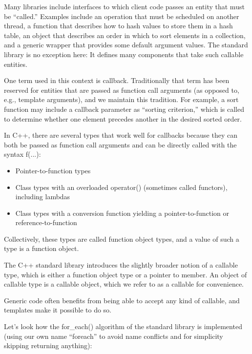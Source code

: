 
Many libraries include interfaces to which client code passes an entity that must be “called.” Examples include an operation that must be scheduled on another thread, a function that describes how to hash values to store them in a hash table, an object that describes an order in which to sort elements in a collection, and a generic wrapper that provides some default argument values. The standard library is no exception here: It defines many components that take such callable entities.

One term used in this context is callback. Traditionally that term has been reserved for entities that are passed as function call arguments (as opposed to, e.g., template arguments), and we maintain this tradition. For example, a sort function may include a callback parameter as “sorting criterion,” which is called to determine whether one element precedes another in the desired sorted order.

In C++, there are several types that work well for callbacks because they can both be passed as function call arguments and can be directly called with the syntax f(...):

\begin{itemize}
\item 
Pointer-to-function types

\item 
Class types with an overloaded operator() (sometimes called functors), including lambdas

\item 
Class types with a conversion function yielding a pointer-to-function or reference-to-function
\end{itemize}

Collectively, these types are called function object types, and a value of such a type is a function object.

The C++ standard library introduces the slightly broader notion of a callable type, which is either a function object type or a pointer to member. An object of callable type is a callable object, which we refer to as a callable for convenience.

Generic code often benefits from being able to accept any kind of callable, and templates make it possible to do so.


Let’s look how the for\_each() algorithm of the standard library is implemented (using our own name “foreach” to avoid name conflicts and for simplicity skipping returning anything):

